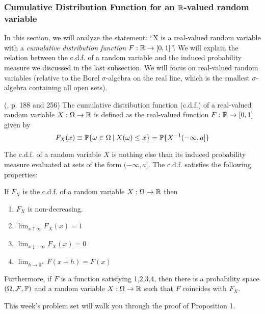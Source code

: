 \documentclass[11pt]{article} %
\begin{document}
\subsubsection{Cumulative Distribution Function for an $\mathbb{R}$-valued random variable}

In this section, we will analyze the statement: ``X is a real-valued random variable with a \emph{cumulative distribution function} $F:\mathbb{R} \rightarrow [0,1]$''. We will explain the relation between the c.d.f. of a random variable and the induced probability measure we discussed in the last subsection. We will focus on real-valued random variables (relative to the Borel $\sigma$-algebra on the real line, which is the smallest $\sigma$-algebra containing all open sets). 

\begin{definition} (\cite{Billingsley95}, p. 188 and 256)
The cumulative distribution function (c.d.f.) of a real-valued random variable $X: \Omega \rightarrow \mathbb{R}$ is defined as the real-valued function $F:\mathbb{R}\rightarrow[0,1]$ given by
$$F_{X}(x) \equiv \mathbb{P}\{ \omega \in \Omega \: | \: X(\omega) \leq x\} = \mathbb{P}\{X^{-1}(-\infty,a]\}    $$
\end{definition}

The c.d.f. of a random variable $X$ is nothing else than its induced probability measure evaluated at sets of the form $(-\infty, a]$. The c.d.f. satisfies the following properties:

\begin{proposition} If $F_{X}$ is the c.d.f. of a random variable $X: \Omega \rightarrow \mathbb{R}$ then 
\begin{enumerate}
\item $F_{X}$ is non-decreasing.
\item $\lim_{x \uparrow \infty} F_{X}(x)=1$
\item $\lim_{x \downarrow -\infty} F_{X}(x)=0$
\item $\lim_{h \rightarrow 0^{+}} F(x+h)=F(x)$
\end{enumerate}

\noindent Furthermore, if $F$ is a function satisfying 1,2,3,4, then there is a probability space $(\Omega, \mathcal{F}, \mathbb{P})$ and a random variable $X: \Omega \rightarrow \mathbb{R}$ such that $F$ coincides with $F_{X}$. 

\end{proposition}

\noindent \begin{prproblem}
   This week's problem set will walk you through the proof of Proposition 1.\\ 
\end{prproblem}
\end{document}

